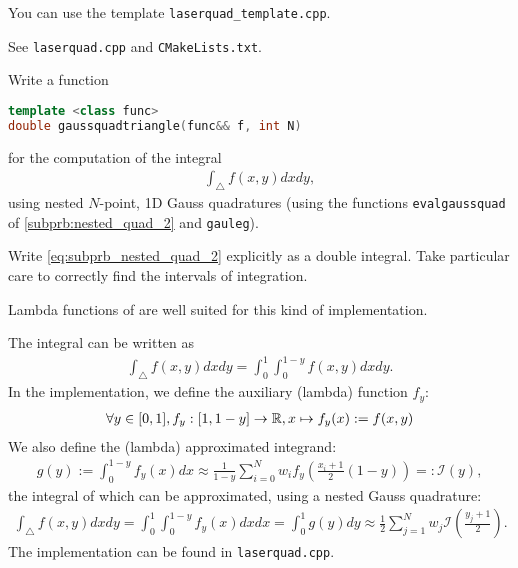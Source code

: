 \begin{problem}
\begin{subproblem}[3]
  \begin{hint}
  You can use the template \verb|laserquad_template.cpp|.
  \end{hint}
  
  \cprotEnv \begin{solution}
   See \verb|laserquad.cpp| and \verb|CMakeLists.txt|.
  \end{solution}
 \end{subproblem}

 \begin{subproblem}[4] \label{subprb:nested_quad_3}
  Write a \Cpp{} function
  \begin{lstlisting}[language=c++]
template <class func>
double gaussquadtriangle(func&& f, int N)
  \end{lstlisting}
  for the computation of the integral
  \begin{align} \label{eq:subprb_nested_quad_2}
   \int_\bigtriangleup f(x,y) dx dy,
  \end{align}
  using nested $N$-point, 1D Gauss quadratures (using the functions \verb|evalgaussquad| of \ref{subprb:nested_quad_2} and  \verb|gauleg|).
  
  \begin{hint}
   Write \eqref{eq:subprb_nested_quad_2} explicitly as a double integral. Take particular care to correctly find the intervals of integration.
  \end{hint}
  
  \begin{hint}
   Lambda functions of \Cpp{} are well suited for this kind of implementation.
  \end{hint}

  
  \cprotEnv \begin{solution}
   The integral can be written as
   \begin{align*}
    \int_\bigtriangleup f(x,y) dx dy = \int_0^1 \int_0^{1-y} f(x,y) dx dy.
   \end{align*}
   In the \Cpp{} implementation, we define the auxiliary (lambda) function $f_y$:
   \begin{align*}
    \forall y \in [0,1], f_y: [1,1-y] \rightarrow \mathbb{R}, x \mapsto f_y(x) := f(x,y)
   \end{align*}
   We also define the (lambda) approximated integrand:
   \begin{align}
    g(y) := \int_0^{1-y} f_y(x) dx \approx \frac{1}{1-y} \sum_{i = 0}^N w_i f_y\left(\frac{x_i + 1}{2}  (1-y)\right) =: \mathcal{I}(y),
   \end{align}
   the integral of which can be approximated, using a nested Gauss quadrature:
   \begin{align}
    \int_\bigtriangleup f(x,y) dx dy  = \int_0^1  \int_0^{1-y} f_y(x) dx dx = \int_0^1 g(y) dy \approx \frac{1}{2} \sum_{j = 1}^N w_j \mathcal{I}\left(\frac{y_j + 1}{2}\right).
   \end{align}
   The implementation can be found in \verb|laserquad.cpp|.
  \end{solution}


\end{subproblem}
\end{problem}
